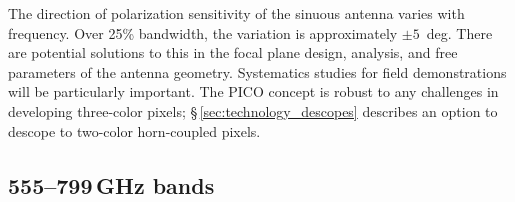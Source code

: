 

The direction of polarization sensitivity of the sinuous antenna varies with frequency. Over 25\% bandwidth, the variation is approximately $\pm 5$~deg.
There are potential solutions to this in the focal plane design, analysis, and free parameters of the antenna geometry.  Systematics studies for field demonstrations will be particularly important. The PICO concept is robust to any challenges in developing three-color pixels; \S\,\ref{sec:technology_descopes} describes an option to descope to two-color horn-coupled pixels.



\subsection{555--799\,GHz bands}
\label{sec:dev_arrays}

